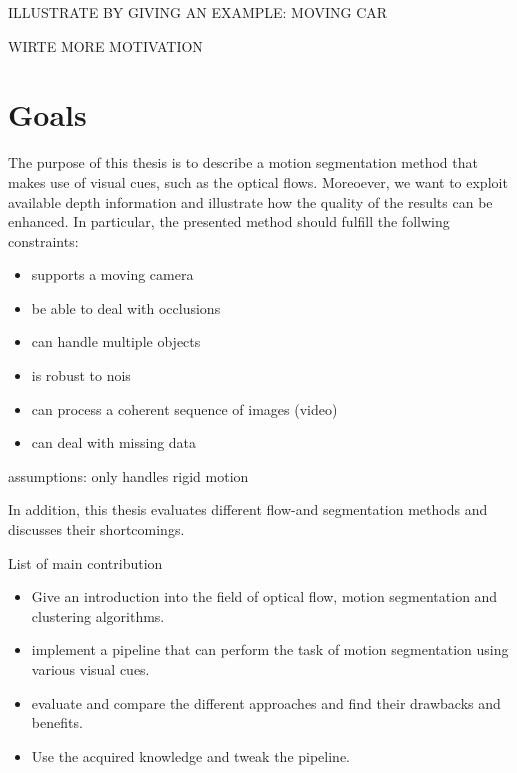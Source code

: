 ILLUSTRATE BY GIVING AN EXAMPLE: MOVING CAR

WIRTE MORE MOTIVATION


\section{Goals}

The purpose of this thesis is to describe a motion segmentation method that makes use of visual cues, such as the optical flows. Moreoever, we want to exploit available depth information and illustrate how the quality of the results can be enhanced. In particular, the presented method should fulfill the follwing constraints:

\begin{itemize}
  \item supports a moving camera
  \item be able to deal with occlusions
  \item can handle multiple objects
  \item is robust to nois
  \item can process a coherent sequence of images (video)
  \item can deal with missing data
\end{itemize}

assumptions: only handles rigid motion
 
In addition, this thesis evaluates different flow-and segmentation methods and discusses their shortcomings.

List of main contribution

\begin{itemize}
  \item Give an introduction into the field of optical flow, motion segmentation and clustering algorithms.
  \item implement a pipeline that can perform the task of motion segmentation using various visual cues.
  \item evaluate and compare the different approaches and find their drawbacks and benefits.
  \item Use the acquired knowledge and tweak the pipeline.
\end{itemize}


